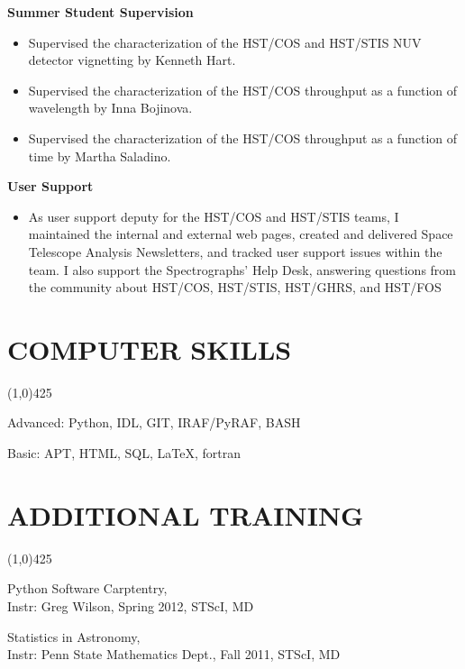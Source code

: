 \documentclass{res}
\begin{document}
\begin{resume}
	{\bf Summer Student Supervision}
		\begin{itemize}
		\item[]  Supervised the characterization of the HST/COS and HST/STIS NUV detector vignetting by Kenneth Hart.
		\item[]  Supervised the characterization of the HST/COS throughput as a function of wavelength by Inna Bojinova.
		\item[]  Supervised the characterization of the HST/COS throughput as a function of time by Martha Saladino.
		\end{itemize}

   {\bf  User Support}
   		\begin{itemize}
		\item[] As user support deputy for the HST/COS and HST/STIS teams, I maintained the internal and external web pages, created and delivered Space Telescope Analysis Newsletters, and tracked user support issues within the team. I also support the Spectrographs' Help Desk, answering questions from the community about HST/COS, HST/STIS, HST/GHRS, and HST/FOS
		\end{itemize}
	
	


\section{COMPUTER SKILLS}
\vspace{-.2in}
\begin{center}
\line(1,0){425}
\end{center}
\vspace{-.3in}
\vspace{0.1in}
Advanced: Python, IDL, GIT, IRAF/PyRAF, BASH

Basic: APT, HTML, SQL, LaTeX, fortran
 

\section{ADDITIONAL TRAINING}
\vspace{-.2in} 
\begin{center}
\line(1,0){425}
\end{center}
\vspace{-.24in} 
\vspace{0.1in}

Python Software Carptentry, \\
Instr: Greg Wilson, Spring 2012, STScI, MD

Statistics in Astronomy, \\
Instr: Penn State Mathematics Dept., Fall 2011, STScI, MD


\end{resume}
\end{document}
